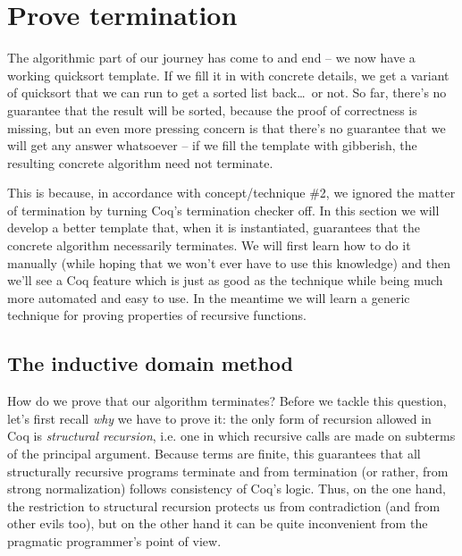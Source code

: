\documentclass[declaration,mgr,english,shortabstract]{iithesis}
\begin{document}
\chapter{Prove termination} \label{termination}

The algorithmic part of our journey has come to and end -- we now have a working quicksort template. If we fill it in with concrete details, we get a variant of quicksort that we can run to get a sorted list back\dots\ or not. So far, there's no guarantee that the result will be sorted, because the proof of correctness is missing, but an even more pressing concern is that there's no guarantee that we will get any answer whatsoever -- if we fill the template with gibberish, the resulting concrete algorithm need not terminate.

This is because, in accordance with concept/technique \#2, we ignored the matter of termination by turning Coq's termination checker off. In this section we will develop a better template that, when it is instantiated, guarantees that the concrete algorithm necessarily terminates. We will first learn how to do it manually (while hoping that we won't ever have to use this knowledge) and then we'll see a Coq feature which is just as good as the technique while being much more automated and easy to use. In the meantime we will learn a generic technique for proving properties of recursive functions.

\section{The inductive domain method}

How do we prove that our algorithm terminates? Before we tackle this question, let's first recall \textit{why} we have to prove it: the only form of recursion allowed in Coq is \textit{structural recursion}, i.e. one in which recursive calls are made on subterms of the principal argument. Because terms are finite, this guarantees that all structurally recursive programs terminate and from termination (or rather, from strong normalization) follows consistency of Coq's logic. Thus, on the one hand, the restriction to structural recursion protects us from contradiction (and from other evils too), but on the other hand it can be quite inconvenient from the pragmatic programmer's point of view.
\end{document}
